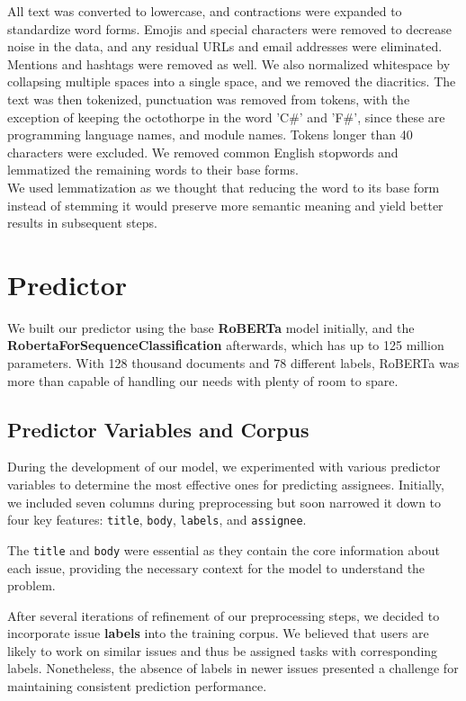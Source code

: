 \documentclass[tikz,10pt,fleqn]{article}
\begin{document}
All text was converted to lowercase, and contractions were expanded to standardize word forms. Emojis and special characters were removed to decrease noise in the data, and any residual URLs and email addresses were eliminated. Mentions and hashtags were removed as well. We also normalized whitespace by collapsing multiple spaces into a single space, and we removed the diacritics.  
The text was then tokenized, punctuation was removed from tokens, with the exception of keeping the octothorpe in the word 'C\#' and 'F\#', since these are programming language names, and module names. Tokens longer than 40 characters were excluded. We removed common English stopwords and lemmatized the remaining words to their base forms.\\ 
We used lemmatization as we thought that reducing the word to its base form instead of stemming it would preserve more semantic meaning and yield better results in subsequent steps.


\section*{Predictor} We built our predictor using the base \textbf{RoBERTa} model initially, and the \textbf{RobertaForSequenceClassification} afterwards, which has up to 125 million parameters. With 128 thousand documents and 78 different labels, RoBERTa was more than capable of handling our needs with plenty of room to spare.

\subsection*{Predictor Variables and Corpus} During the development of our model, we experimented with various predictor variables to determine the most effective ones for predicting assignees. Initially, we included seven columns during preprocessing but soon narrowed it down to four key features: \texttt{title}, \texttt{body}, \texttt{labels}, and \texttt{assignee}.

The \texttt{title} and \texttt{body} were essential as they contain the core information about each issue, providing the necessary context for the model to understand the problem.

After several iterations of refinement  of our preprocessing steps, we decided to incorporate issue \textbf{labels} into the training corpus. We believed that users are likely to work on similar issues and thus be assigned tasks with corresponding labels. Nonetheless, the absence of labels in newer issues presented a challenge for maintaining consistent prediction performance.
\end{document}
